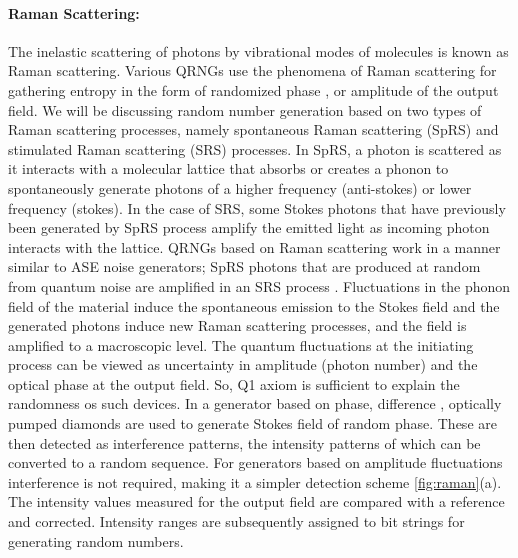 \documentclass[]{interact}
\theoremstyle{plain}%
\theoremstyle{definition}
\theoremstyle{remark}
\begin{document}
\paragraph{Raman Scattering:} The inelastic scattering of photons by vibrational modes of molecules is known as Raman scattering. Various QRNGs use the phenomena of Raman scattering for gathering entropy in the form of randomized phase \cite{bustard2011quantum}, or amplitude \cite{bustard2013quantum} of the output field. We will be discussing random number generation based on two types of Raman scattering processes, namely spontaneous Raman scattering (SpRS) and stimulated Raman scattering (SRS) processes. In SpRS, a photon is scattered as it interacts with a molecular lattice that absorbs or creates a phonon to spontaneously generate photons of a higher frequency (anti-stokes) or lower frequency (stokes). In the case of SRS, some Stokes photons that have previously been generated by SpRS process amplify the emitted light as incoming photon interacts with the lattice. QRNGs based on Raman scattering work in a manner similar to ASE noise generators; SpRS photons that are produced at random from quantum noise are amplified in an SRS process \cite{PENZKOFER197955}. Fluctuations in the phonon field of the material induce the spontaneous emission to the Stokes
field \cite{RAYMER1990181} and the generated photons induce new Raman scattering processes, and the field is amplified to a macroscopic level. The quantum fluctuations at the initiating process can be viewed as uncertainty in amplitude (photon number)  and the optical phase at the output field. So, Q1 axiom is sufficient to explain the randomness os such devices. In a generator based on phase, difference \cite{bustard2011quantum}, optically pumped diamonds are used to generate Stokes field of random phase. These are then detected as interference patterns, the intensity patterns of which can be converted to a random sequence. For generators based on amplitude fluctuations \cite{bustard2013quantum} interference is not required, making it a simpler detection scheme \autoref{fig:raman}(a). The intensity values measured for the output field are compared with a reference and corrected. Intensity ranges are subsequently assigned to bit strings for generating random numbers. \\
\end{document}
